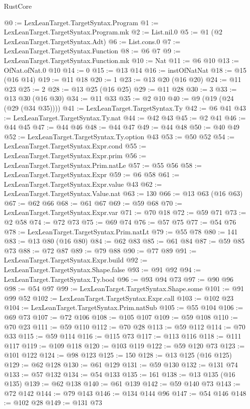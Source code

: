 \begin{lexlean}{RustCore}
\begin{coremodule}
@0 := LexLeanTarget.TargetSyntax.Program
@1 := LexLeanTarget.TargetSyntax.Program.mk
@2 := List.nil.{0}
@5 := @1 (@2 LexLeanTarget.TargetSyntax.Adt)
@6 := List.cons.{0}
@7 := LexLeanTarget.TargetSyntax.Function
@8 := @6 @7
@9 := LexLeanTarget.TargetSyntax.Function.mk
@10 := Nat
@11 := @6 @10
@13 := OfNat.ofNat.{0} @10
@14 := 0
@15 := @13 @14
@16 := instOfNatNat
@18 := @15 (@16 @14)
@19 := @11 @18
@20 := 1
@23 := @13 @20 (@16 @20)
@24 := @11 @23
@25 := 2
@28 := @13 @25 (@16 @25)
@29 := @11 @28
@30 := 3
@33 := @13 @30 (@16 @30)
@34 := @11 @33
@35 := @2 @10
@40 := @9 (@19 (@24 (@29 (@34 @35))))
@41 := LexLeanTarget.TargetSyntax.Ty
@42 := @6 @41
@43 := LexLeanTarget.TargetSyntax.Ty.nat
@44 := @42 @43
@45 := @2 @41
@46 := @44 @45
@47 := @44 @46
@48 := @44 @47
@49 := @44 @48
@50 := @40 @49
@52 := LexLeanTarget.TargetSyntax.Ty.option @43
@53 := @50 @52
@54 := LexLeanTarget.TargetSyntax.Expr.cond
@55 := LexLeanTarget.TargetSyntax.Expr.prim
@56 := LexLeanTarget.TargetSyntax.Prim.natLe
@57 := @55 @56
@58 := LexLeanTarget.TargetSyntax.Expr
@59 := @6 @58
@61 := LexLeanTarget.TargetSyntax.Expr.value @43
@62 := LexLeanTarget.TargetSyntax.Value.nat
@63 := 130
@66 := @13 @63 (@16 @63)
@67 := @62 @66
@68 := @61 @67
@69 := @59 @68
@70 := LexLeanTarget.TargetSyntax.Expr.var
@71 := @70 @18
@72 := @59 @71
@73 := @2 @58
@74 := @72 @73
@75 := @69 @74
@76 := @57 @75
@77 := @54 @76
@78 := LexLeanTarget.TargetSyntax.Prim.natLt
@79 := @55 @78
@80 := 141
@83 := @13 @80 (@16 @80)
@84 := @62 @83
@85 := @61 @84
@87 := @59 @85 @73
@88 := @72 @87
@89 := @79 @88
@90 := @77 @89
@91 := LexLeanTarget.TargetSyntax.Expr.build
@92 := LexLeanTarget.TargetSyntax.Shape.false
@93 := @91 @92
@94 := LexLeanTarget.TargetSyntax.Ty.bool
@96 := @93 @94 @73
@97 := @90 @96
@98 := @54 @97
@99 := LexLeanTarget.TargetSyntax.Shape.some
@101 := @91 @99 @52
@102 := LexLeanTarget.TargetSyntax.Expr.call
@103 := @102 @23
@104 := LexLeanTarget.TargetSyntax.Prim.natSub
@105 := @55 @104
@106 := @69 @73
@107 := @72 @106
@108 := @105 @107
@109 := @59 @108
@110 := @70 @23
@111 := @59 @110
@112 := @70 @28
@113 := @59 @112
@114 := @70 @33
@115 := @59 @114
@116 := @115 @73
@117 := @113 @116
@118 := @111 @117
@119 := @109 @118
@120 := @103 @119
@122 := @59 @120 @73
@123 := @101 @122
@124 := @98 @123
@125 := 150
@128 := @13 @125 (@16 @125)
@129 := @62 @128
@130 := @61 @129
@131 := @59 @130
@132 := @131 @74
@133 := @57 @132
@134 := @54 @133
@135 := 161
@138 := @13 @135 (@16 @135)
@139 := @62 @138
@140 := @61 @139
@142 := @59 @140 @73
@143 := @72 @142
@144 := @79 @143
@146 := @134 @144 @96
@147 := @54 @146
@148 := @102 @28
@149 := @131 @73

\end{coremodule}
\end{lexlean}

